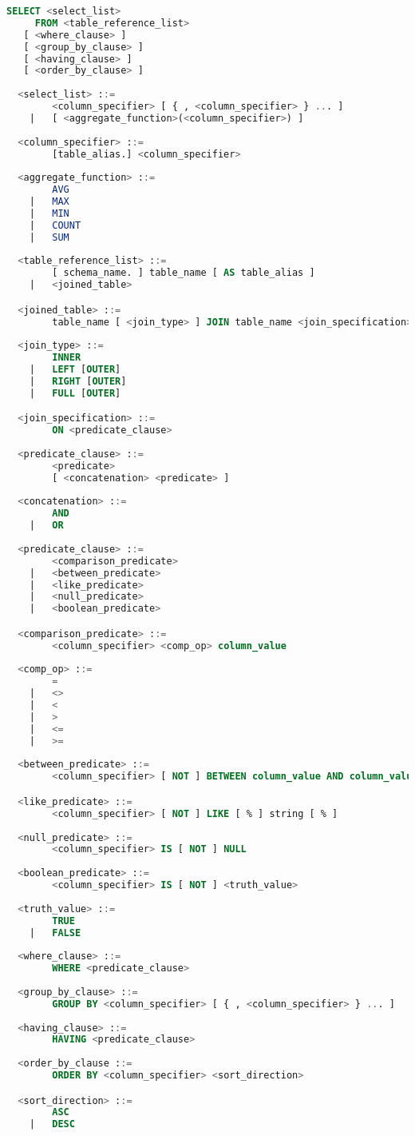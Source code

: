 \begin{lstlisting}[language=SQL, caption={\ac{DQL} keyword subset}, captionpos=b, label={lst:sqlsubset}]
  SELECT <select_list>
     FROM <table_reference_list>
   [ <where_clause> ]
   [ <group_by_clause> ]
   [ <having_clause> ]
   [ <order_by_clause> ]
   
  <select_list> ::=
        <column_specifier> [ { , <column_specifier> } ... ]
    |   [ <aggregate_function>(<column_specifier>) ]
    
  <column_specifier> ::=
        [table_alias.] <column_specifier>
    
  <aggregate_function> ::=
        AVG
    |   MAX
    |   MIN
    |   COUNT
    |   SUM
    
  <table_reference_list> ::=
        [ schema_name. ] table_name [ AS table_alias ]
    |   <joined_table>

  <joined_table> ::=
        table_name [ <join_type> ] JOIN table_name <join_specification>
    
  <join_type> ::=
        INNER
    |   LEFT [OUTER]
    |   RIGHT [OUTER]
    |   FULL [OUTER]

  <join_specification> ::=
        ON <predicate_clause>
        
  <predicate_clause> ::=
        <predicate>
        [ <concatenation> <predicate> ]
    
  <concatenation> ::=
        AND
    |   OR
    
  <predicate_clause> ::=
        <comparison_predicate>
    |   <between_predicate>
    |   <like_predicate>
    |   <null_predicate>
    |   <boolean_predicate>

  <comparison_predicate> ::=
        <column_specifier> <comp_op> column_value
        
  <comp_op> ::=
        =
    |   <>
    |   <
    |   >
    |   <=
    |   >=
  
  <between_predicate> ::=
        <column_specifier> [ NOT ] BETWEEN column_value AND column_value

  <like_predicate> ::=
        <column_specifier> [ NOT ] LIKE [ % ] string [ % ]
  
  <null_predicate> ::=
        <column_specifier> IS [ NOT ] NULL
  
  <boolean_predicate> ::=
        <column_specifier> IS [ NOT ] <truth_value>
  
  <truth_value> ::=
        TRUE
    |   FALSE
    
  <where_clause> ::=
        WHERE <predicate_clause>
        
  <group_by_clause> ::=
        GROUP BY <column_specifier> [ { , <column_specifier> } ... ]
  
  <having_clause> ::=
        HAVING <predicate_clause>
  
  <order_by_clause ::=
        ORDER BY <column_specifier> <sort_direction>

  <sort_direction> ::=
        ASC
    |   DESC
    
\end{lstlisting}